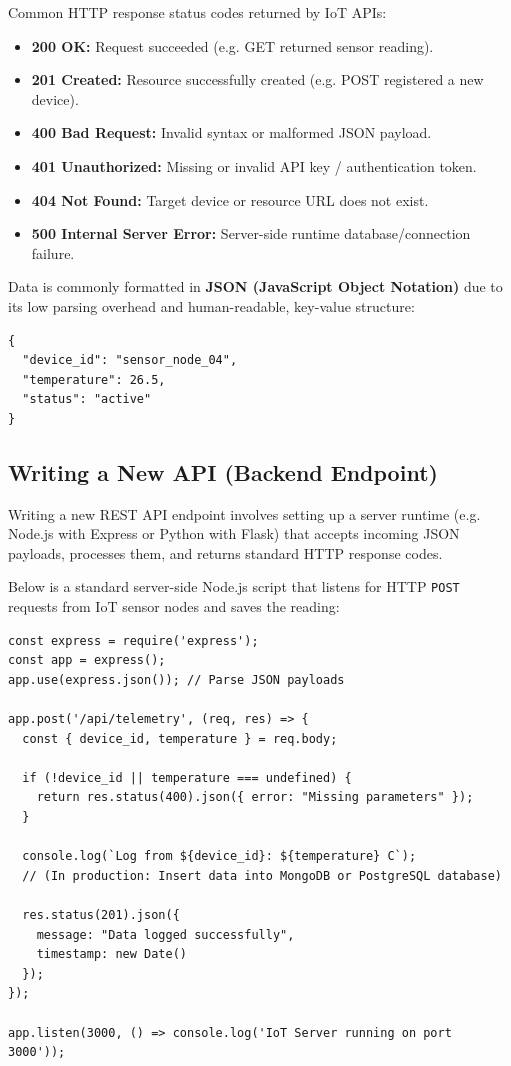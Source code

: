\documentclass[12pt,a4paper]{article}
\begin{document}
Common HTTP response status codes returned by IoT APIs:
\begin{itemize}[leftmargin=*, itemsep=2.5pt]
  \item \textbf{200 OK:} Request succeeded (e.g. GET returned sensor reading).
  \item \textbf{201 Created:} Resource successfully created (e.g. POST registered a new device).
  \item \textbf{400 Bad Request:} Invalid syntax or malformed JSON payload.
  \item \textbf{401 Unauthorized:} Missing or invalid API key / authentication token.
  \item \textbf{404 Not Found:} Target device or resource URL does not exist.
  \item \textbf{500 Internal Server Error:} Server-side runtime database/connection failure.
\end{itemize}

Data is commonly formatted in \textbf{JSON (JavaScript Object Notation)} due to its low parsing overhead and human-readable, key-value structure:
\begin{verbatim}
{
  "device_id": "sensor_node_04",
  "temperature": 26.5,
  "status": "active"
}
\end{verbatim}
\subsection{Writing a New API (Backend Endpoint)}
Writing a new REST API endpoint involves setting up a server runtime (e.g. Node.js with Express or Python with Flask) that accepts incoming JSON payloads, processes them, and returns standard HTTP response codes.
\begin{tcolorbox}[examplebox, title={Express.js IoT Server-Side Logging API}]
  Below is a standard server-side Node.js script that listens for HTTP \texttt{POST} requests from IoT sensor nodes and saves the reading:
\begin{verbatim}
const express = require('express');
const app = express();
app.use(express.json()); // Parse JSON payloads

app.post('/api/telemetry', (req, res) => {
  const { device_id, temperature } = req.body;
  
  if (!device_id || temperature === undefined) {
    return res.status(400).json({ error: "Missing parameters" });
  }
  
  console.log(`Log from ${device_id}: ${temperature} C`);
  // (In production: Insert data into MongoDB or PostgreSQL database)
  
  res.status(201).json({ 
    message: "Data logged successfully", 
    timestamp: new Date() 
  });
});

app.listen(3000, () => console.log('IoT Server running on port 3000'));
\end{verbatim}
\end{tcolorbox}
\end{document}
